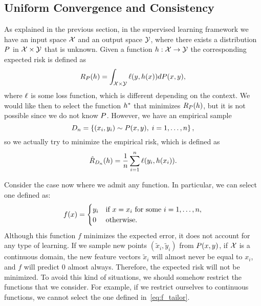 \subsection{Uniform Convergence and Consistency}
%
As explained in the previous section, in the supervised learning framework we have an input space $\mathcal{X}$ and an output space $\mathcal{Y}$, where there exists a distribution $P$ in $\mathcal{X} \times \mathcal{Y}$ that is unknown. Given a function $h: \mathcal{X} \to \mathcal{Y}$ the corresponding expected risk is defined as
\begin{equation}
    \nonumber %
    \exprisk(\hypf) = \int_{\Xspace \times \Yspace} \ell(y, \hypf(x)) d\distf(x, y) ,
\end{equation}
where $\ell$ is some loss function, which is different depending on the context.
%
We would like then to select the function ${h}^*$ that minimizes $R_P(h)$, but it is not possible since we do not know $P$. However, we have an empirical sample 
$$ D_{n} = \left\{(x_i, y_i) \sim P(x, y), \; i=1, \ldots, n\right\} ,$$
so we actually try to minimize the empirical risk, which is defined as
\begin{equation}
    \nonumber %
    \empriskn(\hypf) = \frac{1}{\nsamples} \sum_{i=1}^\nsamples \ell(y_i, \hypf(x_i)) .
\end{equation}

Consider the case now where we admit any function. In particular, we can select one defined as: 
\begin{equation}
    \label{eq:f_tailor}
    f(x) = 
    \begin{cases}
        y_i & \text{if } x = x_i \text{ for some } i = 1, \ldots, \nsamples, \\
        0 & \text{otherwise}.
    \end{cases}
\end{equation}
Although this function $f$ minimizes the expected error, it does not account for any type of learning. If we sample new points $(\tilde{x}_i, \tilde{y}_i)$ from $P(x, y)$, if $\mathcal{X}$ is a continuous domain, the new feature vectors $\tilde{x}_i$ will almost never be equal to $x_i$, and $f$ will predict $0$ almost always. Therefore, the expected risk will not be minimized.
%
To avoid this kind of situations, we should somehow restrict the functions that we consider. For example, if we restrict ourselves to continuous functions, we cannot select the one defined in~\eqref{eq:f_tailor}.   


